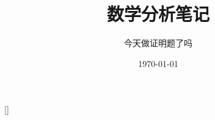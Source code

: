 \def\pgfsysdriver{pgfsys -dvipdfmx.def}
\usepackage{tikz}
\usepackage{amsmath}
\usepackage{amssymb}

\title{数学分析笔记}

\author{今天做证明题了吗}
\date{\today}

\setcounter{tocdepth}{3}


[]